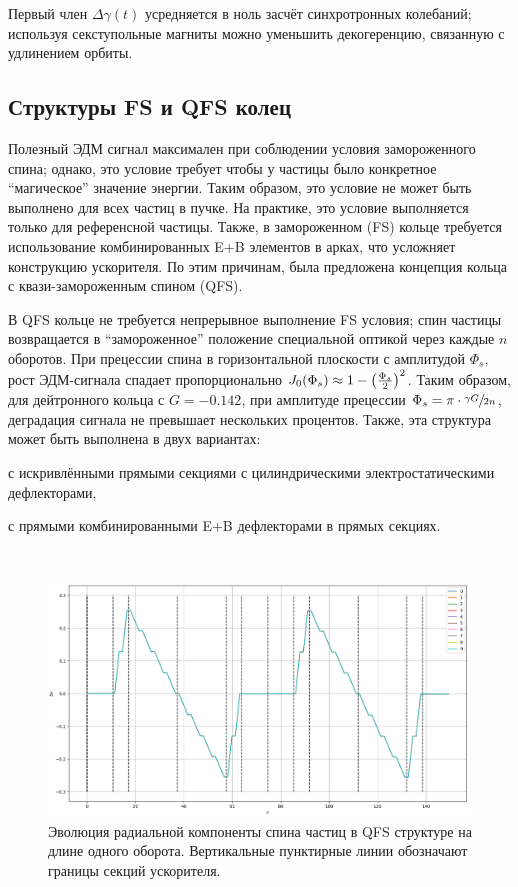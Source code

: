 \documentclass{article}
\begin{document}
	Первый член $\Delta\gamma(t)$ усредняется в ноль засчёт синхротронных колебаний; используя секступольные магниты можно уменьшить декогеренцию, связанную с удлинением орбиты.
	
	
	\subsection{Структуры FS и QFS колец}
	Полезный ЭДМ сигнал максимален при соблюдении условия замороженного спина; однако, это условие требует чтобы у частицы было конкретное ``магическое'' значение энергии. Таким образом, это условие не может быть выполнено для всех частиц в пучке. На практике, это условие выполняется только для референсной частицы. Также, в замороженном (FS) кольце требуется использование комбинированных E+B элементов в арках, что усложняет конструкцию ускорителя. По этим причинам, была предложена концепция кольца с квази-замороженным спином (QFS).
	
	В QFS кольце не требуется непрерывное выполнение FS условия; спин частицы возвращается в ``замороженное'' положение специальной оптикой через каждые $n$ оборотов. При прецессии спина в горизонтальной плоскости с амплитудой $\Phi_s$, рост ЭДМ-сигнала спадает пропорционально $J_0(\Phi_s) \approx 1 - \bkt{\frac{\Phi_s}{2}}^2$. Таким образом, для дейтронного кольца с $G = -0.142$, при амплитуде прецессии $\Phi_s = \pi\cdot\sfrac{\gamma G}{2n}$, деградация сигнала не превышает нескольких процентов. Также, эта структура может быть выполнена в двух вариантах: 
	\begin{inparaenum}[1)]
		\item с искривлёнными прямыми секциями с цилиндрическими электростатическими дефлекторами,
		\item с прямыми комбинированными E+B дефлекторами в прямых секциях.
	\end{inparaenum}~\cite{SenichevICAP15}

	\begin{figure}
		\centering
		\includegraphics[scale=.5]{edm_img/EB_QFS_Sx_vs_s_1turn}
		\caption{Эволюция радиальной компоненты спина частиц в QFS структуре на длине одного оборота. Вертикальные пунктирные линии обозначают границы секций ускорителя.}
	\end{figure}
	
\end{document}
